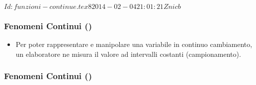 %
%
%
%
%
\svnInfo $Id: funzioni-continue.tex 8 2014-02-04 21:01:21Z nicb $

\setcounter{ms}{1}
\begin{frame}
    \frametitle{Fenomeni Continui ()}

	\begin{itemize}[<+- | alert@+->]

		\item Per poter rappresentare e manipolare una variabile
			in continuo cambiamento, un elaboratore ne misura
			il valore ad intervalli costanti (campionamento).

	\end{itemize}

  \vspace{-1ex}

\end{frame}

\begin{frame}
    \frametitle{Fenomeni Continui ()}

			\begin{center}
			\end{center}

\end{frame}
